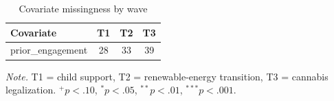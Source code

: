 \begin{table}[htbp]
\centering
\begin{threeparttable}
\caption{Covariate missingness by wave}
\label{tab:tab_covariate_missingness}
\begin{tabular}{lccc}
\toprule
  Covariate & T1 & T2 & T3 \\
\midrule
  prior\_engagement & 28 & 33 & 39 \\
\bottomrule
\end{tabular}
\begin{tablenotes}\footnotesize\item \textit{Note.} T1 = child support, T2 = renewable-energy transition, T3 = cannabis legalization. $^{+}p<.10$, $^{*}p<.05$, $^{**}p<.01$, $^{***}p<.001$.\end{tablenotes}
\end{threeparttable}
\end{table}
